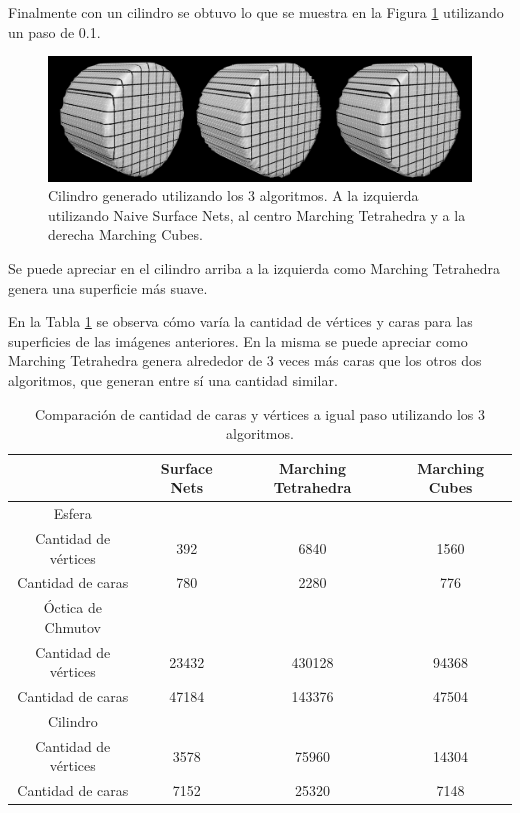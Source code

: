 \documentclass[12pt]{article}
\begin{document}
Finalmente con un cilindro se obtuvo lo que se muestra en la Figura \ref{cilindro1G}  utilizando un paso de 0.1.

\begin{figure}[h!]
\includegraphics[width=\linewidth,center]{compec3.png}
\caption{Cilindro generado utilizando los 3 algoritmos.  A la izquierda utilizando Naive Surface Nets, al centro Marching Tetrahedra y a la derecha Marching Cubes.}
  \label{cilindro1G}
\end{figure}

Se puede apreciar en el cilindro arriba a la izquierda  como Marching Tetrahedra genera una superficie más suave.

En la Tabla \ref{cip} se observa cómo varía la cantidad de vértices y caras para las superficies de las imágenes anteriores. En la misma se puede apreciar como Marching Tetrahedra genera alrededor de 3 veces más caras que los otros dos algoritmos, que generan entre sí una cantidad similar.
\clearpage
\begin{table}[h!]
  \centering
  \begin{tabular}{cccc}
    \toprule
    & Surface Nets & Marching Tetrahedra & Marching Cubes\\
    \midrule
    Esfera&&&\\
    Cantidad de vértices & 392 & 6840 & 1560\\
    Cantidad de caras & 780 & 2280 & 776\\
\hline
     Óctica de Chmutov&&&\\
     Cantidad de vértices & 23432 & 430128 & 94368\\
    Cantidad de caras & 47184 & 143376 & 47504\\
\hline
     Cilindro&&&\\
    Cantidad de vértices & 3578 & 75960 & 14304\\
    Cantidad de caras & 7152 & 25320 & 7148\\
\bottomrule
  \end{tabular}
  \caption{Comparación de cantidad de caras y vértices a igual paso utilizando los 3 algoritmos.}
  \label{cip}
\end{table}
\end{document}
